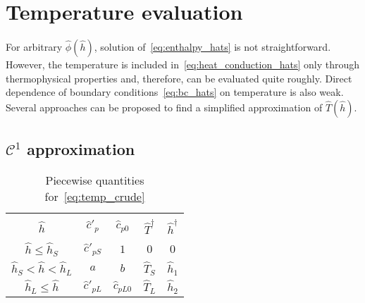 \documentclass{article}
\begin{document}
\section{Temperature evaluation}

For arbitrary \(\hat{\phi}(\hat{h})\), solution of~\eqref{eq:enthalpy_hats} is not straightforward.
However, the temperature is included in~\eqref{eq:heat_conduction_hats} only through thermophysical properties
and, therefore, can be evaluated quite roughly.
Direct dependence of boundary conditions~\eqref{eq:bc_hats} on temperature is also weak.
Several approaches can be proposed to find a simplified approximation of \(\hat{T}(\hat{h})\).

\subsection{\(\mathcal{C}^1\) approximation}

\begin{table}[ht]
    \centering
    \caption{Piecewise quantities for~\eqref{eq:temp_crude}}
    \label{table:temp_params}
    \begin{tabular}{c|cccc}
        \hline\\[-1em]
        \(\hat{h}\)                         & \(\hat{c}'_p\)    & \(\hat{c}_{p0}\)  & \(\hat{T}^\dag\) & \(\hat{h}^\dag\) \\[0.3em]
        \hline\\[-1em]
        \(\hat{h} \leq \hat{h}_S\)          & \(\hat{c}'_{pS}\) & \(1\)             & \(0\)            & \(0\)            \\[0.3em]
        \(\hat{h}_S < \hat{h} < \hat{h}_L\) & \(a\)             & \(b\)             & \(\hat{T}_S\)    & \(\hat{h}_1\)    \\[0.3em]
        \(\hat{h}_L \leq \hat{h}\)          & \(\hat{c}'_{pL}\) & \(\hat{c}_{pL0}\) & \(\hat{T}_L\)    & \(\hat{h}_2\)    \\[0.3em]
        \hline
    \end{tabular}
\end{table}
\end{document}
